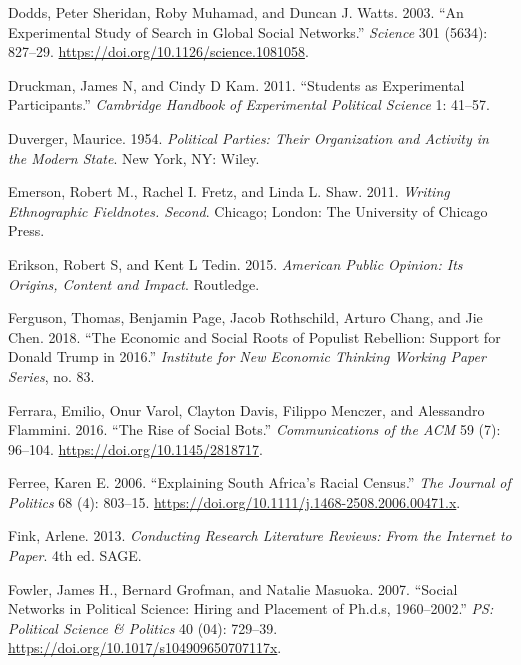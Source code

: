 \documentclass{book}
\newlength{\cslhangindent}
\newlength{\cslentryspacingunit} %
\newenvironment{CSLReferences}[2] %
 {%
  \setlength{\parindent}{0pt}
  \ifodd #1
  \let\oldpar\par
  \def\par{\hangindent=\cslhangindent\oldpar}
  \fi
  \setlength{\parskip}{#2\cslentryspacingunit}
 }%
 {}
\begin{document}
\begin{CSLReferences}{1}{0}
\leavevmode{}%
Dodds, Peter Sheridan, Roby Muhamad, and Duncan J. Watts. 2003. {``An
Experimental Study of Search in Global Social Networks.''} \emph{Science} 301
(5634): 827--29. \url{https://doi.org/10.1126/science.1081058}.

\leavevmode{}%
Druckman, James N, and Cindy D Kam. 2011. {``Students as Experimental
Participants.''} \emph{Cambridge Handbook of Experimental Political Science}
1: 41--57.

\leavevmode{}%
Duverger, Maurice. 1954. \emph{Political {Parties}: {Their Organization} and
{Activity} in the {Modern State}}. New York, NY: {Wiley}.

\leavevmode{}%
Emerson, Robert M., Rachel I. Fretz, and Linda L. Shaw. 2011. \emph{Writing
Ethnographic Fieldnotes. Second}. Chicago; London: The University of Chicago
Press.

\leavevmode{}%
Erikson, Robert S, and Kent L Tedin. 2015. \emph{American Public Opinion: Its
Origins, Content and Impact}. Routledge.

\leavevmode{}%
Ferguson, Thomas, Benjamin Page, Jacob Rothschild, Arturo Chang, and Jie Chen.
2018. {``The Economic and Social Roots of Populist Rebellion: Support for
Donald Trump in 2016.''} \emph{Institute for New Economic Thinking Working
Paper Series}, no. 83.

\leavevmode{}%
Ferrara, Emilio, Onur Varol, Clayton Davis, Filippo Menczer, and Alessandro
Flammini. 2016. {``The Rise of Social Bots.''} \emph{Communications of the
{ACM}} 59 (7): 96--104. \url{https://doi.org/10.1145/2818717}.

\leavevmode{}%
Ferree, Karen E. 2006. {``Explaining {South Africa}'s {Racial Census}.''}
\emph{The Journal of Politics} 68 (4): 803--15.
\url{https://doi.org/10.1111/j.1468-2508.2006.00471.x}.

\leavevmode{}%
Fink, Arlene. 2013. \emph{Conducting {Research Literature Reviews}: {From} the
{Internet} to {Paper}}. 4th ed. {SAGE}.

\leavevmode{}%
Fowler, James H., Bernard Grofman, and Natalie Masuoka. 2007. {``Social
Networks in Political Science: Hiring and Placement of Ph.d.s, 1960--2002.''}
\emph{{PS}: Political Science {\&} Politics} 40 (04): 729--39.
\url{https://doi.org/10.1017/s104909650707117x}.


\end{CSLReferences}
\end{document}
